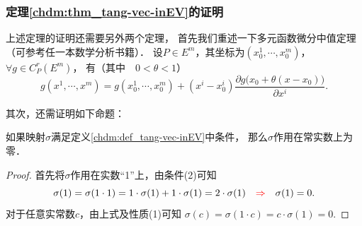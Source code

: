 \subsubsection{定理\ref{chdm:thm_tang-vec-inEV}的证明}
上述定理的证明还需要另外两个定理，
首先我们重述一下多元函数微分中值定理（可参考任一本数学分析书籍）．
设$P\in E^m$，其坐标为$(x^1_0,\cdots,x^m_0)$，$\forall g\in C^r_P(E^m)$，
有（其中$\quad 0<\theta<1$）
\begin{equation}\label{chdm:eqn_wfzzdl}
    g(x^1,\cdots,x^m)=g(x^1_0,\cdots,x^m_0)+ 
    (x^i-x^i_0) \frac{\partial g\bigl(x_0+\theta(x-x_0) \bigr)}{\partial x^i}.        
\end{equation}

其次，还需证明如下命题：
\begin{proposition}\label{chdm:thm_dc0}
    如果映射$\sigma$满足定义\ref{chdm:def_tang-vec-inEV}中条件，
    那么$\sigma$作用在常实数上为零．    
\end{proposition}
\begin{proof}
    首先将$\sigma$作用在实数“1”上，由条件(2)可知
    \begin{equation*}
        \sigma(1)=\sigma(1\cdot 1)=1\cdot \sigma(1)+ 1\cdot \sigma(1)
        =2\cdot \sigma(1) 
        \quad {\color{red}\Rightarrow} \quad
        \sigma(1)=0.        
    \end{equation*}
    对于任意实常数$c$，由上式及性质(1)可知
    $\sigma(c)=\sigma(1\cdot c)=c\cdot \sigma(1)=0.$
\end{proof}

